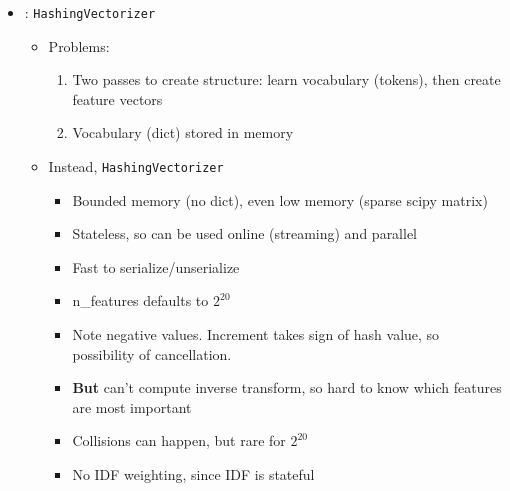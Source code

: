 \begin{itemize}
\begin{itemize}
  \end{itemize}
\item {}: \texttt{HashingVectorizer}
  \begin{itemize}
  \item Problems:
    \begin{enumerate}
    \item Two passes to create structure: learn vocabulary (tokens), then create feature vectors
    \item Vocabulary (dict) stored in memory
    \end{enumerate}
  \item Instead, \texttt{HashingVectorizer}
    \begin{itemize}
    \item Bounded memory (no dict), even low memory (sparse scipy matrix)
    \item Stateless, so can be used online (streaming) and parallel
    \item Fast to serialize/unserialize
    \item n\_features defaults to $2^{20}$
    \item Note negative values.  Increment takes sign of hash value, so possibility of cancellation.
    \item \textbf{But} can't compute inverse transform, so hard to know which features are most important
    \item Collisions can happen, but rare for $2^{20}$
    \item No IDF weighting, since IDF is stateful
    \end{itemize}
  \end{itemize}


\end{itemize}
